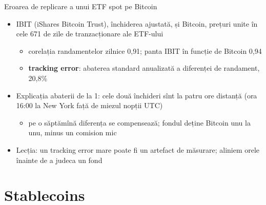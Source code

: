 \begin{frame}{Eroarea de replicare a unui ETF spot pe Bitcoin}
\itemsize{\small}
\begin{itemize}
    \item IBIT (iShares Bitcoin Trust), închiderea ajustată, și Bitcoin, prețuri unite în cele 671 de zile de tranzacționare ale ETF-ului
    \begin{itemize}
        \item corelația randamentelor zilnice 0{,}91; panta IBIT în funcție de Bitcoin 0{,}94
        \item \textbf{tracking error}: abaterea standard anualizată a diferenței de randament, 20{,}8\%
    \end{itemize}
    \item Explicația abaterii de la 1: cele două închideri sînt la patru ore distanță (ora 16:00 la New York față de miezul nopții UTC)
    \begin{itemize}
        \item pe o săptămînă diferența se compensează; fondul deține Bitcoin unu la unu, minus un comision mic
    \end{itemize}
    \item Lecția: un tracking error mare poate fi un artefact de măsurare; aliniem orele înainte de a judeca un fond
\end{itemize}
\end{frame}


\section{Stablecoins}

